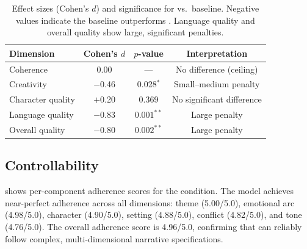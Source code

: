 \begin{table}[t]
    \centering
    \caption{Effect sizes (Cohen's $d$) and significance for \compcontrolled vs.\ \titleonly baseline. Negative values indicate the baseline outperforms \compcontrolled. Language quality and overall quality show large, significant penalties.}
    \begin{tabular}{@{}lccc@{}}
        \toprule
        \textbf{Dimension} & \textbf{Cohen's $d$} & \textbf{$p$-value} & \textbf{Interpretation} \\
        \midrule
        Coherence & 0.00 & --- & No difference (ceiling) \\
        Creativity & $-$0.46 & 0.028$^*$ & Small--medium penalty \\
        Character quality & $+$0.20 & 0.369 & No significant difference \\
        Language quality & $\mathbf{-0.83}$ & $\mathbf{0.001}^{**}$ & Large penalty \\
        Overall quality & $\mathbf{-0.80}$ & $\mathbf{0.002}^{**}$ & Large penalty \\
        \bottomrule
    \end{tabular}
    \label{tab:effects}
\end{table}

\subsection{Controllability}
\label{sec:results_control}

 shows per-component adherence scores for the \compcontrolled condition.
The model achieves near-perfect adherence across all dimensions: theme (5.00/5.0), emotional arc (4.98/5.0), character (4.90/5.0), setting (4.88/5.0), conflict (4.82/5.0), and tone (4.76/5.0).
The overall adherence score is 4.96/5.0, confirming that \gptfour can reliably follow complex, multi-dimensional narrative specifications.

